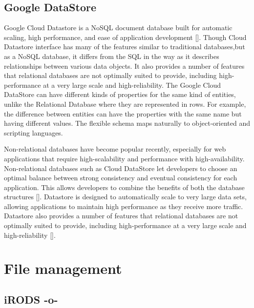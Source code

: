 \subsection{Google DataStore}

Google Cloud Datastore is a NoSQL document database built for
automatic scaling, high performance, and ease of application
development [\cite{www-google-datastore}]. Though Cloud Datastore
interface has many of the features similar to traditional
databases,but as a NoSQL database, it differs from the SQL in the way
as it describes relationships between various data objects. It also
provides a number of features that relational databases are not
optimally suited to provide, including high-performance at a very
large scale and high-reliability. The Google Cloud DataStore can have
different kinds of properties for the same kind of entities, unlike
the Relational Database where they are represented in rows. For
example, the difference between entities can have the properties with
the same name but having different values. The flexible schema maps
naturally to object-oriented and scripting languages.

Non-relational databases have become popular recently, especially for
web applications that require high-scalability and performance with
high-availability. Non-relational databases such as Cloud DataStore
let developers to choose an optimal balance between strong consistency
and eventual consistency for each application. This allows developers
to combine the benefits of both the database
structures [\cite{www-google-datastore-2}].  Datastore is designed to
automatically scale to very large data sets, allowing applications to
maintain high performance as they receive more traffic. Datastore also
provides a number of features that relational databases are not
optimally suited to provide, including high-performance at a very
large scale and high-reliability [\cite{www-google-datastore}].

\section{File management}


\subsection{iRODS -o-}

